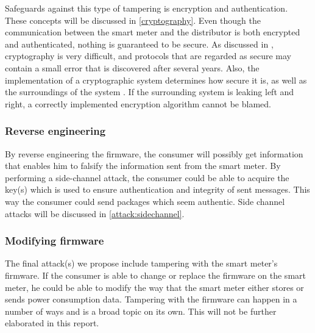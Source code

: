 Safeguards against this type of tampering is encryption and authentication. 
These concepts will be discussed in \cref{cryptography}.
Even though the communication between the smart meter and the distributor is both encrypted and authenticated, nothing is guaranteed to be secure.
As discussed in \citet{cryptoenginering}, cryptography is very difficult, and protocols that are regarded as secure may contain a small error that is discovered after several years.
Also, the implementation of a cryptographic system determines how secure it is, as well as the surroundings of the system \citep{cryptoenginering}. 
If the surrounding system is leaking left and right, a correctly implemented encryption algorithm cannot be blamed.

\subsubsection{Reverse engineering}
By reverse engineering the firmware, the consumer will possibly get information that enables him to falsify the information sent from the smart meter.
By performing a side-channel attack, the consumer could be able to acquire the key(s) which is used to ensure authentication and integrity of sent messages.
This way the consumer could send packages which seem authentic.
Side channel attacks will be discussed in \cref{attack:sidechannel}.

\subsubsection{Modifying firmware}
The final attack(s) we propose include tampering with the smart meter's firmware.
If the consumer is able to change or replace the firmware on the smart meter, he could be able to modify the way that the smart meter either stores or sends power consumption data.
Tampering with the firmware can happen in a number of ways and is a broad topic on its own.
This will not be further elaborated in this report.